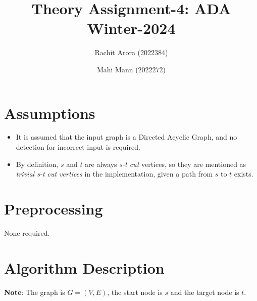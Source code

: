 \documentclass{article}
\title{Theory Assignment-4: ADA Winter-2024}
\author{Rachit Arora (2022384) \and Mahi Mann (2022272)}
\date{}
\begin{document}
\maketitle

\section{Assumptions}

\begin{itemize}
    \item It is assumed that the input graph is a Directed Acyclic Graph, and no detection for incorrect input is required.

    \item By definition, $s$ and $t$ are always \emph{s-t cut} vertices, so they are mentioned as \emph{trivial s-t cut vertices} in the implementation, given a path from $s$ to $t$ exists. 
\end{itemize}

\section{Preprocessing}

None required.

\section{Algorithm Description}

\textbf{Note}: The graph is $G = (V,E)$, the start node is $s$ and the target node is $t$.
\end{document}
